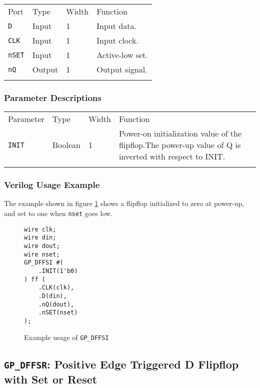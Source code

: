\documentclass[11pt]{article}
\newcommand{\tokenstyle}[1]{\texttt{#1}}
\newcommand{\wirestyle}[1]{\texttt{#1}}
\newcommand{\whenstyle}[1]{{\fontseries{sb}\selectfont#1}}
\newcommand{\thinhline}{\Xhline{1\arrayrulewidth}}
\newcommand{\thickhline}{\Xhline{2.5\arrayrulewidth}}
\begin{document}
\begin{tabularx}{\textwidth}{lllX}
\thinhline
\whenstyle{Port} & \whenstyle{Type} & \whenstyle{Width} & \whenstyle{Function} \\
\thickhline
\tokenstyle{D} & Input & 1 & Input data. \\
\thinhline
\tokenstyle{CLK} & Input & 1 & Input clock. \\
\thinhline
\tokenstyle{nSET} & Input & 1 & Active-low set. \\
\thinhline
\tokenstyle{nQ} & Output & 1 & Output signal. \\
\thinhline
\end{tabularx}

\subsubsection{Parameter Descriptions}

\begin{tabularx}{\textwidth}{lllX}
\thinhline
\whenstyle{Parameter} & \whenstyle{Type} & \whenstyle{Width} & \whenstyle{Function} \\
\thickhline
\tokenstyle{INIT} & Boolean & 1 & Power-on initialization value of the flipflop.\newline The power-up value of Q is
inverted with respect to INIT.\\
\thinhline
\end{tabularx}

\subsubsection{Verilog Usage Example}

The example shown in figure \ref{gp-dffsi-example} shows a flipflop initialized to zero at power-up, and set to one
when \wirestyle{nset} goes low.

\begin{figure}[h]
\begin{lstlisting}
wire clk;
wire din;
wire dout;
wire nset;
GP_DFFSI #(
	.INIT(1'b0)
) ff (
	.CLK(clk),
	.D(din),
	.nQ(dout),
	.nSET(nset)
);
\end{lstlisting}
\caption{Example usage of \tokenstyle{GP\_DFFSI}}
\label{gp-dffsi-example}
\end{figure}


\pagebreak
\subsection{\tokenstyle{GP\_DFFSR}: Positive Edge Triggered D Flipflop with Set or Reset}
\label{gp-dffsr}
\end{document}
